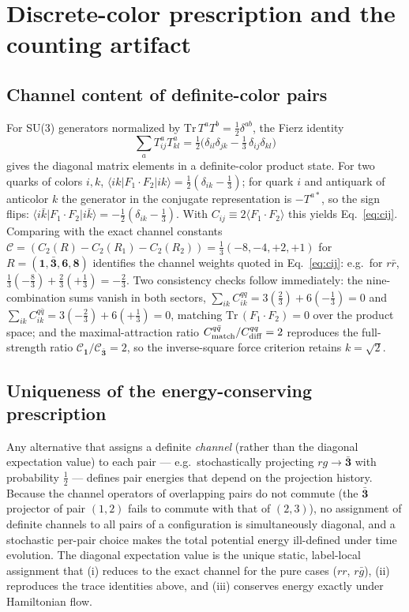 \section{Discrete-color prescription and the counting artifact}
\label{app:color}

\subsection{Channel content of definite-color pairs}

For SU(3) generators normalized by $\mathrm{Tr}\,T^aT^b=\tfrac12\delta^{ab}$,
the Fierz identity
\begin{equation}
\sum_a T^a_{ij}T^a_{kl}
= \tfrac12\big(\delta_{il}\delta_{jk}-\tfrac13\,\delta_{ij}\delta_{kl}\big)
\label{eq:fierz}
\end{equation}
gives the diagonal matrix elements in a definite-color product state.  For
two quarks of colors $i,k$,
$\langle ik|F_1\!\cdot\!F_2|ik\rangle=\tfrac12(\delta_{ik}-\tfrac13)$;
for quark $i$ and antiquark of anticolor $k$ the generator in the conjugate
representation is $-T^{a*}$, so the sign flips:
$\langle i\bar k|F_1\!\cdot\!F_2|i\bar k\rangle
=-\tfrac12(\delta_{ik}-\tfrac13)$.  With $C_{ij}\equiv 2\langle
F_1\!\cdot\!F_2\rangle$ this yields Eq.~\eqref{eq:cij}.  Comparing with
the exact channel constants
$\mathcal C=(C_2(R)-C_2(R_1)-C_2(R_2))=\tfrac13(-8,-4,+2,+1)$ for
$R=(\mathbf 1,\bar{\mathbf 3},\mathbf 6,\mathbf 8)$ identifies the channel
weights quoted in Eq.~\eqref{eq:cij}: e.g.\ for $r\bar r$,
$\tfrac13(-\tfrac83)+\tfrac23(+\tfrac13)=-\tfrac23$.  Two consistency
checks follow immediately: the nine-combination sums vanish in both
sectors, $\sum_{ik}C^{qq}_{ik}=3(\tfrac23)+6(-\tfrac13)=0$ and
$\sum_{ik}C^{q\bar q}_{ik}=3(-\tfrac23)+6(+\tfrac13)=0$, matching
$\mathrm{Tr}\,(F_1\!\cdot\!F_2)=0$ over the product space; and the
maximal-attraction ratio $C^{q\bar q}_{\rm match}/C^{qq}_{\rm diff}=2$
reproduces the full-strength ratio
$\mathcal C_{\mathbf 1}/\mathcal C_{\bar{\mathbf 3}}=2$, so the
inverse-square force criterion retains $k=\sqrt2$.

\subsection{Uniqueness of the energy-conserving prescription}

Any alternative that assigns a definite \emph{channel} (rather than the
diagonal expectation value) to each pair --- e.g.\ stochastically
projecting $rg\to\bar{\mathbf 3}$ with probability $\tfrac12$ --- defines
pair energies that depend on the projection history.  Because the channel
operators of overlapping pairs do not commute (the $\bar{\mathbf 3}$
projector of pair $(1,2)$ fails to commute with that of $(2,3)$), no
assignment of definite channels to all pairs of a configuration is
simultaneously diagonal, and a stochastic per-pair choice makes the total
potential energy ill-defined under time evolution.  The diagonal
expectation value is the unique static, label-local assignment that
(i) reduces to the exact channel for the pure cases ($rr$, $r\bar g$),
(ii) reproduces the trace identities above, and (iii) conserves energy
exactly under Hamiltonian flow.


